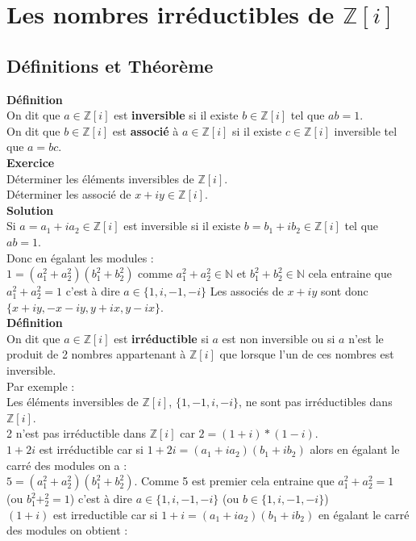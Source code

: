 \documentclass[a4paper,11pt]{book}
\newcommand{\Z}{{\mathbb{Z}}}
\newcommand{\N}{{\mathbb{N}}}
\begin{document}
\section{Les nombres irr\'eductibles de $\Z[i]$}
\subsection{D\'efinitions et Th\'eor\`eme}
{\bf D\'efinition}\\
On dit que $a \in \Z[i]$ est {\bf inversible} si il existe $b \in \Z[i]$ 
tel que $ab=1$.\\
On dit que $b \in \Z[i]$ est {\bf associ\'e} \`a $a \in \Z[i]$ si il existe 
$c \in \Z[i]$ inversible tel que $a=bc$.\\
{\bf Exercice}\\
D\'eterminer les \'el\'ements inversibles de $\Z[i]$.\\
D\'eterminer les associ\'e de $x+iy \in \Z[i]$.\\
{\bf Solution}\\
Si  $a=a_1+ia_2 \in \Z[i]$ est inversible si il existe $b=b_1+ib_2 \in \Z[i]$ 
tel que $ab=1$.\\
Donc en \'egalant les modules :\\
$1=(a_1^2+a_2^2)(b_1^2+b_2^2)$ comme $a_1^2+a_2^2 \in \N$ et  
$b_1^2+b_2^2 \in \N$ cela entraine que $a_1^2+a_2^2=1$ c'est \`a dire
$a\in \{1,i,-1,-i\}$
Les associ\'es de $x+iy$ sont donc $\{x+iy,-x-iy,y+ix,y-ix\}$.\\
{\bf D\'efinition}\\
On dit que $a \in \Z[i]$ est {\bf irr\'eductible} si $a$ est non inversible ou 
si $a$ n'est le produit de 2 nombres appartenant \`a $\Z[i]$ que lorsque l'un 
de ces nombres est inversible.\\
Par exemple :\\
Les \'el\'ements inversibles de $\Z[i]$, $\{1,-1,i,-i\}$, ne sont pas 
irr\'eductibles dans $\Z[i]$.\\
2 n'est pas irr\'eductible dans $\Z[i]$ car $2=(1+i)*(1-i)$.\\
$1+2i$ est irr\'eductible car si $1+2i=(a_1+ia_2)(b_1+ib_2)$ alors en \'egalant
le carr\'e des modules on a :\\
$5=(a_1^2+a_2^2)(b_1^2+b_2^2)$. Comme 5 est premier cela entraine que 
$a_1^2+a_2^2=1$ (ou $b_1^2+_2^2=1$) c'est \`a dire
$a\in \{1,i,-1,-i\}$ (ou $b\in \{1,i,-1,-i\}$)\\
$(1+i)$ est irreductible car si $1+i=(a_1+ia_2)(b_1+ib_2)$ en \'egalant le
carr\'e des modules on obtient :\\
\end{document}
